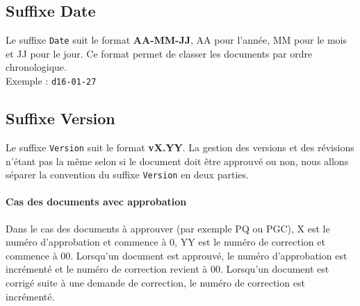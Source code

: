 \subsection{Suffixe Date}
\label{suffixe_date}

Le suffixe \verb+Date+ suit le format \textbf{AA-MM-JJ}, AA pour l'année, MM pour le mois et JJ pour le jour. Ce format permet de classer les documents par ordre chronologique.\\

Exemple : \verb+d16-01-27+

\subsection{Suffixe Version}
\label{suffixe_version}
Le suffixe \verb+Version+ suit le format \textbf{vX.YY}. La gestion des versions et des révisions n'étant pas la même selon si le document doit être approuvé ou non, nous allons séparer la convention du suffixe \verb+Version+ en deux parties. \\

\paragraph{Cas des documents avec approbation\\}

Dans le cas des documents à approuver (par exemple PQ ou PGC), X est le numéro d'approbation et commence à 0, YY est le numéro de correction et commence à 00. Lorsqu'un document est approuvé, le numéro d'approbation est incrémenté et le numéro de correction revient à 00. Lorsqu'un document est corrigé suite à une demande de correction, le numéro de correction est incrémenté.

